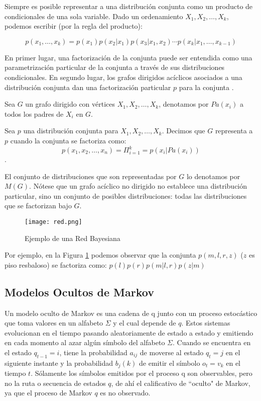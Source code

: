 Siempre es posible representar a una distribución conjunta como un producto de condicionales de una sola variable. Dado un ordenamiento $X_1,X_2,…,X_k$, podemos escribir (por la regla del producto):

$$p(x_1, \ldots ,x_k)=p(x_1)p(x_2|x_1)p(x_3|x_1,x_2) \cdots p(x_k|x_1,\ldots ,x_{k-1})$$

En primer lugar, una factorizaci\'{o}n de la conjunta puede ser entendida como una parametrizaci\'{o}n particular de la conjunta a trav\'{e}s de sus distribuciones condicionales. En segundo lugar, los grafos dirigidos ac\'{i}clicos asociados a una distribuci\'{o}n conjunta dan una factorizaci\'{o}n particular $p$ para la conjunta \cite{koller2009probabilistic}.

Sea $G$ un grafo dirigido con v\'{e}rtices $X_1,X_2,\ldots,X_k$, denotamos por $Pa(x_i)$ a todos los padres de $X_i$ en $G$.

Sea $p$ una distribución conjunta para $X_1,X_2,\ldots,X_k$. Decimos que $G$ representa a $p$ cuando la conjunta se factoriza como:
$$p(x_1,x_2,\ldots,x_n)= \Pi^k_{i=1}=p(x_i|Pa(x_i))$$.

El conjunto de distribuciones que son representadas por $G$ lo denotamos por $M(G)$. N\'{o}tese que un grafo ac\'{i}clico no dirigido no establece una distribuci\'{o}n particular, sino un conjunto de posibles distribuciones: todas las distribuciones que se factorizan bajo $G$.
\begin{figure}[h]
\caption{Ejemplo de una Red Bayesiana}
\centering
\texttt{[image: red.png]}
\label{fig:red1}
\end{figure}

Por ejemplo, en la Figura \ref{fig:red1} podemos observar que la conjunta $p(m,l,r,z)$ ($z$ es piso resbaloso) se factoriza como: $p(l)p(r)p(m|l,r)p(z|m)$

\subsection{Modelos Ocultos de Markov}
Un modelo oculto de Markov es una cadena de q junto con un proceso estoc\'{a}stico que
toma valores en un alfabeto $\Sigma$ y el cual depende de $q$.
Estos sistemas evolucionan en el tiempo pasando aleatoriamente de estado a estado y
emitiendo en cada momento al azar algún símbolo del alfabeto $\Sigma$. Cuando se encuentra
en el estado $q_{t-1} = i$, tiene la probabilidad $a
_{ij}$ de moverse al estado $q_t = j$ en el siguiente
instante y la probabilidad $b_j(k)$ de emitir el s\'{i}mbolo $o_t = v_k$ en el tiempo $t$.
S\'{o}lamente los s\'{i}mbolos emitidos por el proceso q son observables, pero no la ruta o
secuencia de estados $q$, de ah\'{i} el calificativo de “oculto" de Markov, ya que el proceso
de Markov $q$ es no observado. 

